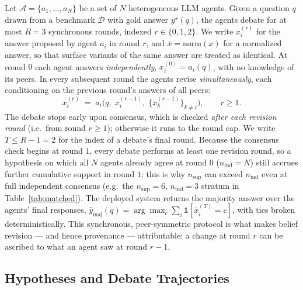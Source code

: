 Let $\mathcal{A}=\{a_1,\dots,a_N\}$ be a set of $N$ heterogeneous LLM agents. Given a question $q$ drawn
from a benchmark $\mathcal{D}$ with gold answer $y^\star(q)$, the agents debate for at most $R=3$ synchronous
rounds, indexed $r\in\{0,1,2\}$. We write $x_i^{(r)}$ for the answer proposed by agent $a_i$ in round $r$, and
$\bar{x}=\mathrm{norm}(x)$ for a normalized answer, so that surface variants of the same answer are
treated as identical. At round $0$ each agent answers \emph{independently},
$x_i^{(0)}=a_i(q)$, with no knowledge of its peers. In every subsequent round the agents revise
\emph{simultaneously}, each conditioning on the previous round's answers of all peers:
\begin{equation}
x_i^{(r)} \;=\; a_i\!\Big(q,\; x_i^{(r-1)},\; \{x_k^{(r-1)}\}_{k\ne i}\Big),\qquad r\ge 1 .
\end{equation}
The debate stops early upon consensus, which is checked \emph{after each revision round} (i.e.\ from round
$r\ge 1$); otherwise it runs to the round cap. We write $T\le R-1=2$ for the index of a debate's final round.
Because the consensus check begins at round $1$, every debate performs at least one revision round, so a
hypothesis on which all $N$ agents already agree at round $0$ ($n_{\mathrm{ind}}=N$) still accrues further
cumulative support in round $1$; this is why $n_{\mathrm{sup}}$ can exceed $n_{\mathrm{ind}}$ even at full
independent consensus (e.g.\ the $n_{\mathrm{sup}}{=}6,\,n_{\mathrm{ind}}{=}3$ stratum in
Table~\ref{tab:matched}). The deployed system returns the majority answer over the agents' final responses,
$\hat{y}_{\mathrm{maj}}(q)=\arg\max_{c}\sum_{i}\mathbb{1}[\bar{x}_i^{(T)}=c]$, with ties broken
deterministically. This synchronous, peer-symmetric protocol is what makes belief revision --- and hence
provenance --- attributable: a change at round $r$ can be ascribed to what an agent saw at round $r-1$.

\subsection{Hypotheses and Debate Trajectories}
\label{subsec:hypothesis_trajectories}

